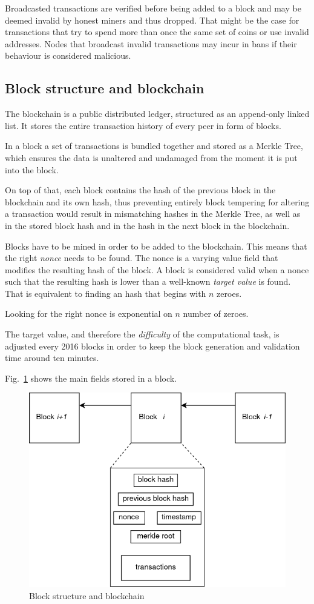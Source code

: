 \documentclass[12pt, letterpaper, twoside]{article}
\begin{document}
Broadcasted transactions are verified before being added to a block and may be deemed invalid by honest miners and thus dropped. That might be the case for transactions that try to spend more than once the same set of coins or use invalid addresses. Nodes that broadcast invalid transactions may incur in bans if their behaviour is considered malicious.

\subsection{Block structure and blockchain}\label{sec:block}
The blockchain is a public distributed ledger, structured as an append-only linked list. It stores the entire transaction history of every peer in form of blocks.

In a block a set of transactions is bundled together and stored as a Merkle Tree, which ensures the data is unaltered and undamaged from the moment it is put into the block.

On top of that, each block contains the hash of the previous block in the blockchain and its own hash, thus preventing entirely block tempering for altering a transaction would result in mismatching hashes in the Merkle Tree, as well as in the stored block hash and in the hash in the next block in the blockchain.

Blocks have to be mined in order to be added to the blockchain. This means that the right \emph{nonce} needs to be found. The nonce is a varying value field that modifies the resulting hash of the block. A block is considered valid when a nonce such that the resulting hash is lower than a well-known \emph{target value} is found. That is equivalent to finding an hash that begins with $n$ zeroes.

Looking for the right nonce is exponential on $n$ number of zeroes.

The target value, and therefore the \emph{difficulty} of the computational task, is adjusted every 2016 blocks in order to keep the block generation and validation time around ten minutes.

Fig.~\ref{fig:blockstruct} shows the main fields stored in a block.

\begin{figure}[h]
	\includegraphics[width=.55\textwidth]{pict/blockstruct.png}
	\centering
	\caption{Block structure and blockchain}
	\label{fig:blockstruct}
\end{figure}
\end{document}

